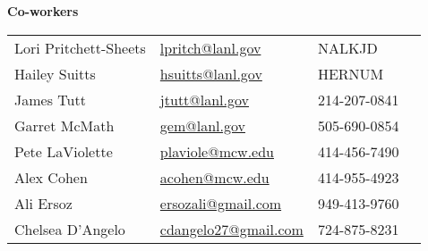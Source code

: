 \begin{minipage}{0.50\textwidth} 
\begin{center}
{\normalsize \textbf{Co-workers}} \vspace{1mm} %
\end{center}
\begin{tabular}{llll}
	Lori Pritchett-Sheets & \href{mailto:lpritch@lanl.gov}{lpritch@lanl.gov} & NALKJD \\
	Hailey Suitts    & \href{mailto:hsuitts@lanl.gov}{hsuitts@lanl.gov} & HERNUM \\
	James Tutt       & \href{mailto:jtutt@lanl.gov}{jtutt@lanl.gov} & 214-207-0841 \\
	Garret McMath    & \href{mailto:gem@lanl.gov}{gem@lanl.gov}    & 505-690-0854 \\
	Pete LaViolette  &  \href{mailto:plaviole@mcw.edu}{plaviole@mcw.edu} & 414-456-7490 \\ %
	Alex Cohen       &  \href{mailto:acohen@mcw.edu}{acohen@mcw.edu} & 414-955-4923 \\
	Ali Ersoz        &  \href{mailto:ersozali@gmail.com}{ersozali@gmail.com} & 949-413-9760 \\
	Chelsea D'Angelo &  \href{mailto:cdangelo27@gmail.com}{cdangelo27@gmail.com} & 724-875-8231\\ %
\end{tabular}
\end{minipage}






